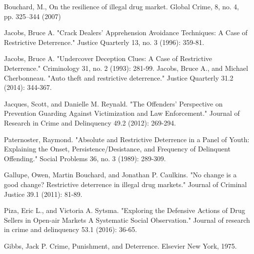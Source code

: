 \documentclass[runningheads,a4paper]{llncs}
\begin{document}
\begin{thebibliography}{4}


 Bouchard, M., On the resilience of illegal drug market. Global Crime, 8, no. 4, pp. 325--344 (2007)

 Jacobs, Bruce A. "Crack Dealers' Apprehension Avoidance Techniques: A Case of Restrictive Deterrence." Justice Quarterly 13, no. 3 (1996): 359-81.

 Jacobs, Bruce A. "Undercover Deception Clues: A Case of Restrictive Deterrence." Criminology 31, no. 2 (1993): 281-99.
Jacobs, Bruce A., and Michael Cherbonneau. "Auto theft and restrictive deterrence." Justice Quarterly 31.2 (2014): 344-367.

 Jacques, Scott, and Danielle M. Reynald. "The Offenders’ Perspective on Prevention Guarding Against Victimization and Law Enforcement." Journal of Research in Crime and Delinquency 49.2 (2012): 269-294.

 Paternoster, Raymond. "Absolute and Restrictive Deterrence in a Panel of Youth: Explaining the Onset, Persistence/Desistance, and Frequency of Delinquent Offending." Social Problems 36, no. 3 (1989): 289-309.

 Gallupe, Owen, Martin Bouchard, and Jonathan P. Caulkins. "No change is a good change? Restrictive deterrence in illegal drug markets." Journal of Criminal Justice 39.1 (2011): 81-89.

 Piza, Eric L., and Victoria A. Sytsma. "Exploring the Defensive Actions of Drug Sellers in Open-air Markets A Systematic Social Observation." Journal of research in crime and delinquency 53.1 (2016): 36-65.

 Gibbs, Jack P. Crime, Punishment, and Deterrence. Elsevier New York, 1975.

\end{thebibliography}
\end{document}

